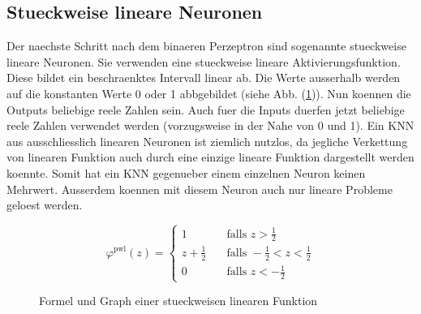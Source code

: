 \subsection{Stueckweise lineare Neuronen}
Der naechste Schritt nach dem binaeren Perzeptron sind sogenannte stueckweise
lineare Neuronen.
Sie verwenden eine stueckweise lineare Aktivierungsfunktion. Diese bildet ein
beschraenktes Intervall linear ab. Die Werte ausserhalb werden auf die
konstanten Werte 0 oder 1 abbgebildet (siehe Abb. (\ref{fig:stueckweiselinear})).
\para{}
Nun koennen die Outputs beliebige reele Zahlen sein. Auch fuer die Inputs duerfen
jetzt beliebige reele Zahlen verwendet werden (vorzugsweise in der Nahe von 0
und 1).
Ein KNN aus ausschliesslich linearen Neuronen ist ziemlich nutzlos, da jegliche Verkettung von
linearen Funktion auch durch eine einzige lineare Funktion dargestellt werden
koennte. Somit hat ein KNN gegenueber einem einzelnen Neuron keinen Mehrwert.
Ausserdem koennen mit diesem Neuron auch nur lineare Probleme geloest werden.
\\
\begin{figure}[h!]
  \begin{minipage}[h!]{0.5\textwidth}
    \begin{equation*}
      \varphi^{\text{pwl}}(z) =
      \begin{cases}
        1 & \quad \text{falls } z > \frac{1}{2}\\
        z + \frac{1}{2} & \quad \text{falls } -\frac{1}{2} < z < \frac{1}{2}\\
        0 & \quad \text{falls } z < -\frac{1}{2}
      \end{cases}
    \end{equation*}
  \end{minipage}
  \begin{minipage}[h!]{0.5\textwidth}
    \centering
  \end{minipage}
  \caption{Formel und Graph einer stueckweisen linearen Funktion}
  \label{fig:stueckweiselinear}
\end{figure}


